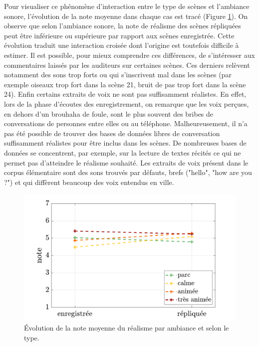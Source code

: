Pour visualiser ce phénomène d'interaction entre le type de scènes et l'ambiance sonore, l'évolution de la note moyenne dans chaque cas est tracé (Figure \ref{fig:interaction_ambianceType}). On observe que selon l'ambiance sonore, la note de réalisme des scènes répliquées peut être inférieure ou supérieure par rapport aux scènes enregistrée. Cette évolution traduit une interaction croisée dont l'origine est toutefois difficile à estimer. Il est possible, pour mieux comprendre ces différences, de s'intéresser aux commentaires laissés par les auditeurs sur certaines scènes. Ces derniers relèvent notamment des sons trop forts ou qui s'inscrivent mal dans les scènes (par exemple oiseaux trop fort dans la scène 21, bruit de pas trop fort dans la scène 24). Enfin certains extraits de voix ne sont pas suffisamment réalistes. En effet, lors de la phase d'écoutes des enregistrement, on remarque que les voix perçues, en dehors d'un brouhaha de foule, sont le plus souvent des bribes de conversations de personnes entre elles ou au téléphone. Malheureusement, il n'a pas été possible de trouver des bases de données libres de conversation suffisamment réalistes pour être inclus dans les scènes. De nombreuses bases de données se concentrent, par exemple, sur la lecture de textes récités \cite{el2011survey, kominek2004cmu, barker2015third} ce qui ne permet pas d'atteindre le réalisme souhaité. Les extraits de voix présent dans le corpus élémentaire sont des sons trouvés par défauts, brefs ("hello", "how are you ?") et qui diffèrent beaucoup des voix entendus en ville.

\begin{figure}[h]
\centering
\includegraphics[width=0.8\linewidth]{./figures/test_perceptif/testPerceptif_interactionAmbiance.pdf}
\caption{Évolution de la note moyenne du réalisme par ambiance et selon le type.}\label{fig:interaction_ambianceType}
\end{figure}


